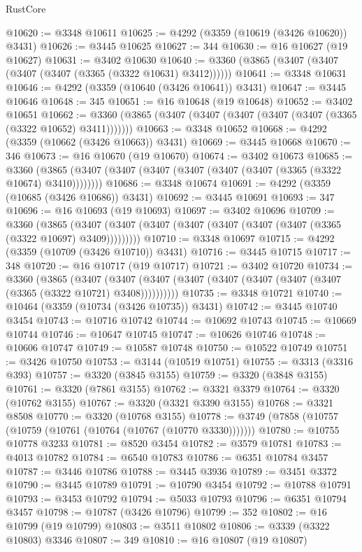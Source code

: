 \begin{lexlean}{RustCore}
\begin{coremodule}
@10620 := @3348 @10611
@10625 := @4292 (@3359 (@10619 (@3426 @10620)) @3431)
@10626 := @3445 @10625
@10627 := 344
@10630 := @16 @10627 (@19 @10627)
@10631 := @3402 @10630
@10640 := @3360 (@3865 (@3407 (@3407 (@3407 (@3407 (@3365 (@3322 @10631) @3412))))))
@10641 := @3348 @10631
@10646 := @4292 (@3359 (@10640 (@3426 @10641)) @3431)
@10647 := @3445 @10646
@10648 := 345
@10651 := @16 @10648 (@19 @10648)
@10652 := @3402 @10651
@10662 := @3360 (@3865 (@3407 (@3407 (@3407 (@3407 (@3407 (@3365 (@3322 @10652) @3411)))))))
@10663 := @3348 @10652
@10668 := @4292 (@3359 (@10662 (@3426 @10663)) @3431)
@10669 := @3445 @10668
@10670 := 346
@10673 := @16 @10670 (@19 @10670)
@10674 := @3402 @10673
@10685 := @3360 (@3865 (@3407 (@3407 (@3407 (@3407 (@3407 (@3407 (@3365 (@3322 @10674) @3410))))))))
@10686 := @3348 @10674
@10691 := @4292 (@3359 (@10685 (@3426 @10686)) @3431)
@10692 := @3445 @10691
@10693 := 347
@10696 := @16 @10693 (@19 @10693)
@10697 := @3402 @10696
@10709 := @3360
    (@3865 (@3407 (@3407 (@3407 (@3407 (@3407 (@3407 (@3407 (@3365 (@3322 @10697) @3409)))))))))
@10710 := @3348 @10697
@10715 := @4292 (@3359 (@10709 (@3426 @10710)) @3431)
@10716 := @3445 @10715
@10717 := 348
@10720 := @16 @10717 (@19 @10717)
@10721 := @3402 @10720
@10734 := @3360
    (@3865
      (@3407 (@3407 (@3407 (@3407 (@3407 (@3407 (@3407 (@3407 (@3365 (@3322 @10721) @3408))))))))))
@10735 := @3348 @10721
@10740 := @10464 (@3359 (@10734 (@3426 @10735)) @3431)
@10742 := @3445 @10740 @3454
@10743 := @10716 @10742
@10744 := @10692 @10743
@10745 := @10669 @10744
@10746 := @10647 @10745
@10747 := @10626 @10746
@10748 := @10606 @10747
@10749 := @10587 @10748
@10750 := @10522 @10749
@10751 := @3426 @10750
@10753 := @3144 (@10519 @10751)
@10755 := @3313 (@3316 @393)
@10757 := @3320 (@3845 @3155)
@10759 := @3320 (@3848 @3155)
@10761 := @3320 (@7861 @3155)
@10762 := @3321 @3379
@10764 := @3320 (@10762 @3155)
@10767 := @3320 (@3321 @3390 @3155)
@10768 := @3321 @8508
@10770 := @3320 (@10768 @3155)
@10778 := @3749 (@7858 (@10757 (@10759 (@10761 (@10764 (@10767 (@10770 @3330)))))))
@10780 := @10755 @10778 @3233
@10781 := @8520 @3454
@10782 := @3579 @10781
@10783 := @4013 @10782
@10784 := @6540 @10783
@10786 := @6351 @10784 @3457
@10787 := @3446 @10786
@10788 := @3445 @3936
@10789 := @3451 @3372
@10790 := @3445 @10789
@10791 := @10790 @3454
@10792 := @10788 @10791
@10793 := @3453 @10792
@10794 := @5033 @10793
@10796 := @6351 @10794 @3457
@10798 := @10787 (@3426 @10796)
@10799 := 352
@10802 := @16 @10799 (@19 @10799)
@10803 := @3511 @10802
@10806 := @3339 (@3322 @10803) @3346
@10807 := 349
@10810 := @16 @10807 (@19 @10807)

\end{coremodule}
\end{lexlean}
